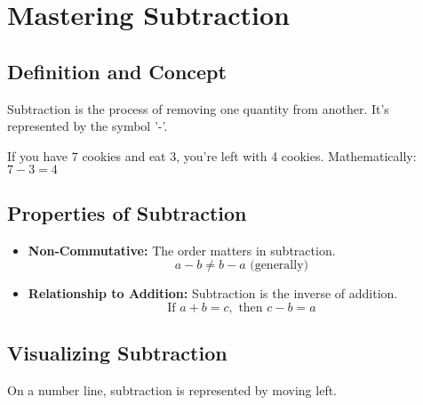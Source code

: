 \begin{center}
\end{center}

\section{Mastering Subtraction}
\subsection{Definition and Concept}
Subtraction is the process of removing one quantity from another. It's represented by the symbol '-'.

\begin{example}
If you have 7 cookies and eat 3, you're left with 4 cookies.
Mathematically: $7 - 3 = 4$
\end{example}

\subsection{Properties of Subtraction}
\begin{itemize}
    \item \textbf{Non-Commutative:} The order matters in subtraction.
    \[ a - b \neq b - a \text{ (generally)} \]
    \item \textbf{Relationship to Addition:} Subtraction is the inverse of addition.
    \[ \text{If } a + b = c, \text{ then } c - b = a \]
\end{itemize}

\subsection{Visualizing Subtraction}
On a number line, subtraction is represented by moving left.

\begin{center}
\end{center}

